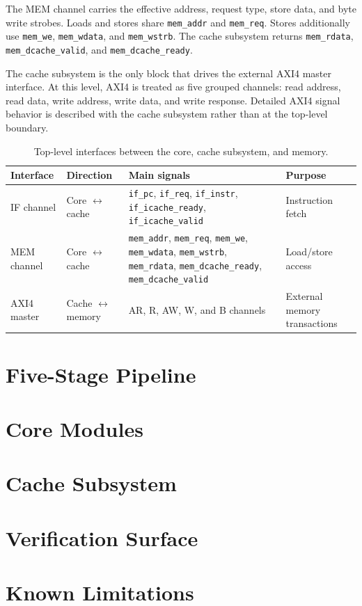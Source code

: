 \documentclass[11pt,a4paper]{article}
\begin{document}
The MEM channel carries the effective address, request type, store data, and
byte write strobes. Loads and stores share \texttt{mem\_addr} and
\texttt{mem\_req}. Stores additionally use \texttt{mem\_we},
\texttt{mem\_wdata}, and \texttt{mem\_wstrb}. The cache subsystem returns
\texttt{mem\_rdata}, \texttt{mem\_dcache\_valid}, and
\texttt{mem\_dcache\_ready}.

The cache subsystem is the only block that drives the external AXI4 master
interface. At this level, AXI4 is treated as five grouped channels: read
address, read data, write address, write data, and write response. Detailed
AXI4 signal behavior is described with the cache subsystem rather than at the
top-level boundary.

\begin{table}[H]
\centering
\small
\begin{tabular}{@{}p{2.2cm}p{2.5cm}p{7.0cm}p{2.3cm}@{}}
\toprule
\textbf{Interface} & \textbf{Direction} & \textbf{Main signals} & \textbf{Purpose} \\
\midrule
IF channel & Core $\leftrightarrow$ cache &
\texttt{if\_pc}, \texttt{if\_req}, \texttt{if\_instr},
\texttt{if\_icache\_ready}, \texttt{if\_icache\_valid} &
Instruction fetch \\
\addlinespace
MEM channel & Core $\leftrightarrow$ cache &
\texttt{mem\_addr}, \texttt{mem\_req}, \texttt{mem\_we},
\texttt{mem\_wdata}, \texttt{mem\_wstrb}, \texttt{mem\_rdata},
\texttt{mem\_dcache\_ready}, \texttt{mem\_dcache\_valid} &
Load/store access \\
\addlinespace
AXI4 master & Cache $\leftrightarrow$ memory &
AR, R, AW, W, and B channels & External memory transactions \\
\bottomrule
\end{tabular}
\caption{Top-level interfaces between the core, cache subsystem, and memory.}
\end{table}

\clearpage
\section{Five-Stage Pipeline}

\section{Core Modules}

\section{Cache Subsystem}

\section{Verification Surface}

\section{Known Limitations}
\end{document}
